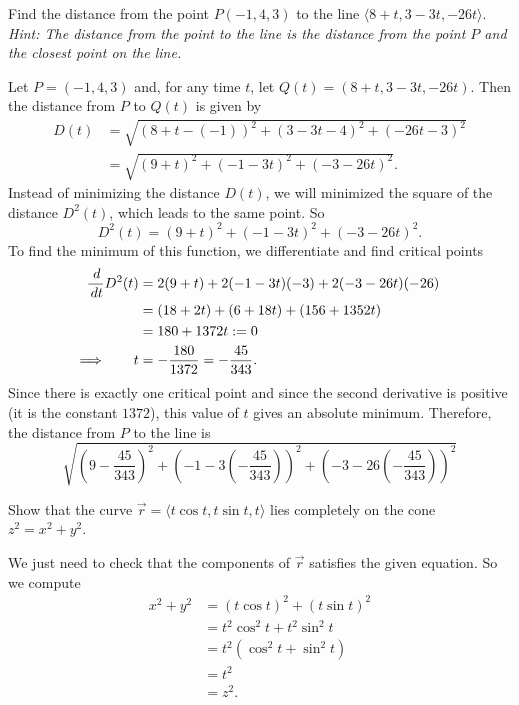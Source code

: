 \documentclass[handout]{ximera}
\begin{document}
\begin{problem}
Find the distance from the point $P(-1,4,3)$ to the line $\langle 8+t,3-3t,-26t \rangle$.  {\it Hint: The distance from the point to the line is the distance from the point $P$ and the closest point on the line.}
	\begin{freeResponse}
	Let $P = (-1,4,3)$ and, for any time $t$, let $Q(t) = (8+t,3-3t,-26t)$.  
	Then the distance from $P$ to $Q(t)$ is given by
		\begin{align*}
		D(t) &=
		\sqrt{(8+t - (-1))^2 + (3-3t -4)^2 + (-26t-3)^2}  \\
		&= \sqrt{(9+t)^2 + (-1-3t)^2 + (-3-26t)^2}.
		\end{align*}
	Instead of minimizing the distance $D(t)$, we will minimized the square of the distance $D^2(t)$, which leads to the same point.  
	So
		\[
		D^2(t) = (9+t)^2 + (-1-3t)^2 + (-3-26t)^2.
		\]
	To find the minimum of this function, we differentiate and find critical points
		\begin{align*}
		\frac{\,d}{\,d t} D^2(t) &= 2(9+t) + 2(-1-3t)(-3) + 2(-3-26t)(-26)  \\
		&= (18 + 2t) + (6 + 18t) + (156 + 1352t)  \\
		&= 180 + 1372t := 0  \\
		\Longrightarrow \qquad t &= - \frac{180}{1372} = - \frac{45}{343}.
		\end{align*}
	Since there is exactly one critical point and since the second derivative is positive (it is the constant $1372$), this value of $t$ gives an absolute minimum.
	Therefore, the distance from $P$ to the line is
		\[
		\boxed{\sqrt{\left( 9-\frac{45}{343} \right)^2 + \left(-1-3\left( - \frac{45}{343} \right) \right)^2 + \left(-3-26\left( - \frac{45}{343} \right) \right)^2}}
		\]
	\end{freeResponse}
		
\end{problem}

\begin{instructorNotes}

\end{instructorNotes}







\begin{problem}
Show that the curve $\vec{r} = \langle t \cos t, t \sin t, t \rangle$ lies completely on the cone $z^2 = x^2 + y^2$.  
	\begin{freeResponse}
	We just need to check that the components of $\vec{r}$ satisfies the given equation.  
	So we compute
		\begin{align*}
		x^2 + y^2 &= (t \cos t)^2 + (t \sin t)^2  \\
		&= t^2 \cos^2 t + t^2 \sin^2 t  \\
		&= t^2 (\cos^2 t + \sin^2 t)  \\
		&= t^2  \\
		&= z^2.
		\end{align*}
	\end{freeResponse}

\end{problem}
\end{document}
